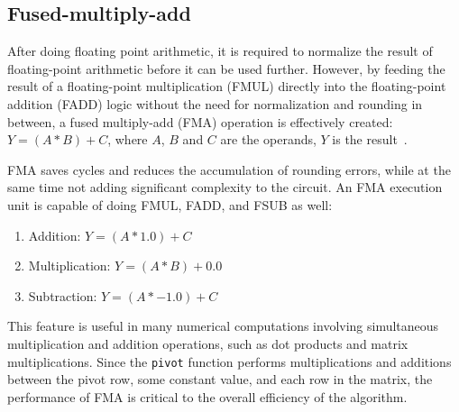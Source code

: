 \documentclass[logo,bsc,singlespacing,parskip]{infthesis}
\newcommand{\pivot}{\texttt{pivot}}
\newenvironment{compactlist}
{ \begin{enumerate}
    \setlength{\itemsep}{0pt}
    \setlength{\parskip}{0pt}
    \setlength{\parsep}{0pt}     
}
{ \end{enumerate} }
\begin{document}
\subsection{Fused-multiply-add}
\label{sec:FMA}

After doing floating point arithmetic, it is required to normalize the result of
floating-point arithmetic before it can be used further. However, by feeding the
result of a floating-point multiplication (FMUL) directly into the
floating-point addition (FADD) logic without the need for normalization and
rounding in between, a fused multiply-add (FMA) operation is effectively
created: 
\begin{math}Y = (A * B) + C \end{math}, where 
\begin{math}A\end{math},
\begin{math}B\end{math} and
\begin{math}C\end{math} are the operands, 
\begin{math}Y\end{math} is the result~\cite{CARD}.

FMA saves cycles and reduces the accumulation of rounding errors, while at the same
time not adding significant complexity to the circuit. An FMA execution unit is
capable of doing FMUL, FADD, and FSUB as well: 
\begin{compactlist} 
\item[] Addition: \begin{math}Y = (A * 1.0) + C \end{math} 
\item[] Multiplication: \begin{math} Y = (A * B) + 0.0 \end{math} 
\item[] Subtraction: \begin{math} Y = (A * -1.0) + C\end{math} 
\end{compactlist} 

This feature is useful in many numerical computations involving
simultaneous multiplication and addition operations, such as dot products and
matrix multiplications. Since the \pivot{} function performs multiplications and
additions between the pivot row, some constant value, and each row in the matrix,
the performance of FMA is critical to the overall efficiency of the algorithm. 
\end{document}
